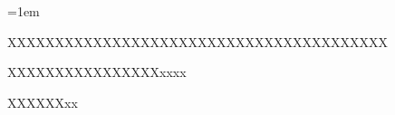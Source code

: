 \ifx\atempxetex\usewhat
\fi


\titleformat{\chapter}[hang]{\xiaosan\bf\raggedright\hei\sf\boldmath}{\xiaoer\chaptertitlename}{18pt}{\xiaosan}
\titlespacing{\chapter}{0pt}{8pt}{16pt}

\makeatletter
\newskip\@footindent
\@footindent=1em

\renewcommand\footnoterule{\kern-3\p@ \hrule width 0.4\columnwidth \kern 2.6\p@}

\long{}

\renewcommand\thefootnote{\pinumber{\arabic{footnote}}}
\def\@makefnmark{\hbox{\textsuperscript{\@thefnmark}}}

\newcommand\pinumber[1]{\ifcase#1 \or \ding{172}\or \ding{173}\or
  \ding{174}\or \ding{175}\or \ding{176}\or \ding{177}%
  \or \ding{178}\or \ding{179}\or \ding{180}\or \ding{181}\else *\fi\relax}
\makeatother

\label{cha1:Introduction}

\label{sec11:Background}

XXXXXXXXXXXXXXXXXXXXXXXXXXXXXXXXXXXXXXXX

XXXXXXXXXXXXXXXXxxxx

XXXXXXxx \cite{psychology_recognition_87}


